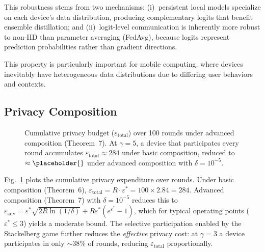 This robustness stems from two mechanisms:
(i)~persistent local models specialize on each device's data distribution,
producing complementary logits that benefit ensemble distillation; and
(ii)~logit-level communication is inherently more robust to non-IID
than parameter averaging (FedAvg), because logits represent
prediction probabilities rather than gradient directions.

This property is particularly important for mobile computing,
where devices inevitably have heterogeneous data distributions
due to differing user behaviors and contexts.

\subsection{Privacy Composition}\label{sec:composition}

\begin{figure}[t]
\centering
\caption{Cumulative privacy budget ($\varepsilon_\text{total}$)
over 100 rounds under advanced composition (Theorem~7).
At $\gamma = 5$, a device that participates every round accumulates
$\varepsilon_\text{total} \approx 284$ under basic composition,
reduced to $\approx \placeholder{}$ under advanced composition
with $\delta = 10^{-5}$.}
\label{fig:composition}
\end{figure}

Fig.~\ref{fig:composition} plots the cumulative privacy expenditure
over rounds.
Under basic composition (Theorem~6), $\varepsilon_\text{total} = R \cdot \varepsilon^*
= 100 \times 2.84 = 284$.
Advanced composition (Theorem~7) with $\delta = 10^{-5}$ reduces this to
$\varepsilon_\text{adv} = \varepsilon^* \sqrt{2R \ln(1/\delta)} + R \varepsilon^* (e^{\varepsilon^*} - 1)$,
which for typical operating points ($\varepsilon^* \leq 3$) yields a
moderate bound.
The selective participation enabled by the Stackelberg game further
reduces the \emph{effective} privacy cost: at $\gamma = 3$ a device
participates in only $\sim$38\% of rounds, reducing
$\varepsilon_\text{total}$ proportionally.

